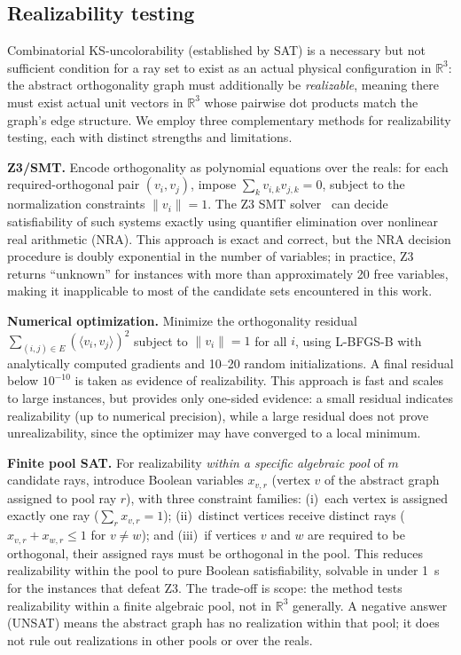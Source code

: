 \documentclass[twocolumn,pra,superscriptaddress,nofootinbib]{revtex4-2}
\newcommand{\R}{\mathbb{R}}
\begin{document}
\subsection{Realizability testing}

Combinatorial KS-uncolorability (established by SAT) is a necessary but not sufficient
condition for a ray set to exist as an actual physical configuration in $\R^3$: the
abstract orthogonality graph must additionally be \emph{realizable}, meaning there must
exist actual unit vectors in $\R^3$ whose pairwise dot products match the graph's edge
structure. We employ three complementary methods for realizability testing, each with
distinct strengths and limitations.

\textbf{Z3/SMT.} Encode orthogonality as polynomial equations over the reals: for each
required-orthogonal pair $(v_i, v_j)$, impose $\sum_k v_{i,k} v_{j,k} = 0$, subject to
the normalization constraints $\|v_i\| = 1$. The Z3 SMT solver~\cite{Z3} can decide
satisfiability of such systems exactly using quantifier elimination over nonlinear real
arithmetic (NRA). This approach is exact and correct, but the NRA decision procedure is
doubly exponential in the number of variables; in practice, Z3 returns ``unknown'' for
instances with more than approximately 20 free variables, making it inapplicable to most
of the candidate sets encountered in this work.

\textbf{Numerical optimization.} Minimize the orthogonality residual
$\sum_{(i,j) \in E} (\langle v_i, v_j \rangle)^2$ subject to $\|v_i\| = 1$ for all $i$,
using L-BFGS-B with analytically computed gradients and 10--20 random initializations.
A final residual below $10^{-10}$ is taken as evidence of realizability. This approach
is fast and scales to large instances, but provides only one-sided evidence: a small
residual indicates realizability (up to numerical precision), while a large residual
does not prove unrealizability, since the optimizer may have converged to a local
minimum.

\textbf{Finite pool SAT.} For realizability \emph{within a specific algebraic pool} of
$m$ candidate rays, introduce Boolean variables $x_{v,r}$ (vertex $v$ of the abstract
graph assigned to pool ray $r$), with three constraint families: (i)~each vertex is
assigned exactly one ray ($\sum_r x_{v,r} = 1$); (ii)~distinct vertices receive distinct
rays ($x_{v,r} + x_{w,r} \leq 1$ for $v \neq w$); and (iii)~if vertices $v$ and $w$
are required to be orthogonal, their assigned rays must be orthogonal in the pool.
This reduces realizability within the pool to pure Boolean satisfiability, solvable
in under 1~s for the instances that defeat Z3. The trade-off is scope: the method tests
realizability within a finite algebraic pool, not in $\R^3$ generally. A negative
answer (UNSAT) means the abstract graph has no realization within that pool; it does
not rule out realizations in other pools or over the reals.
\end{document}
